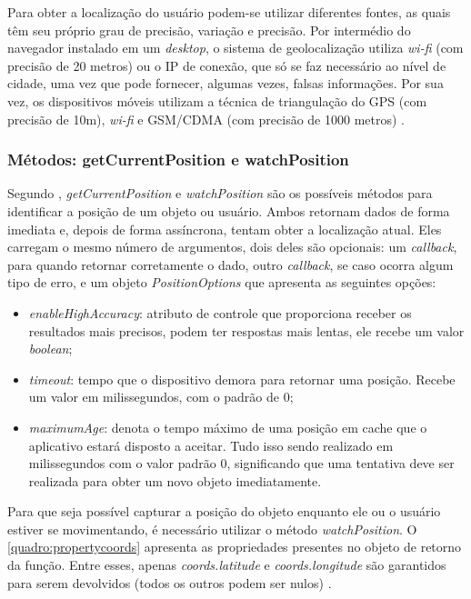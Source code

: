 Para obter a localização do usuário podem-se utilizar diferentes fontes, as quais têm seu próprio grau de precisão, variação e precisão. Por intermédio do navegador instalado em um \textit{desktop}, o sistema de geolocalização utiliza \textit{wi-fi} (com precisão de 20 metros) ou o IP de conexão, que só se faz necessário ao nível de cidade,  uma vez que pode fornecer, algumas vezes, falsas informações. Por sua vez, os dispositivos móveis utilizam a técnica de triangulação do GPS (com precisão de 10m), \textit{wi-fi} e GSM/CDMA (com precisão de 1000 metros) \cite{geolocalizacao:2011}.

\subsubsection{Métodos: getCurrentPosition e watchPosition}

Segundo , \textit{getCurrentPosition} e \textit{watchPosition} são os possíveis métodos para identificar a posição de um objeto ou usuário. Ambos retornam dados de forma imediata e, depois de forma assíncrona, tentam obter a localização atual. Eles carregam o mesmo número de argumentos, dois deles são opcionais: um \textit{callback}, para quando retornar corretamente o dado, outro \textit{callback}, se caso ocorra algum tipo de erro, e um objeto \textit{PositionOptions} que apresenta as seguintes opções:

\newpage
\begin{itemize}
    \item \textit{enableHighAccuracy}: atributo de controle que proporciona receber os resultados mais precisos, podem ter respostas mais lentas, ele recebe um valor \textit{boolean};
    \item \textit{timeout}: tempo que o dispositivo demora para retornar uma posição. Recebe um valor em milissegundos, com o padrão de 0;
    \item \textit{maximumAge}: denota o tempo máximo de uma posição em cache que o aplicativo estará disposto a aceitar. Tudo isso sendo realizado em milissegundos com o valor padrão 0, significando que uma tentativa deve ser realizada para obter um novo objeto imediatamente.
\end{itemize}

Para que seja possível capturar a posição do objeto enquanto ele ou o usuário estiver se movimentando, é necessário utilizar o método \textit{watchPosition}. O \autoref{quadro:propertycoords} apresenta as propriedades presentes no objeto de retorno da função. Entre esses, apenas \textit{coords.latitude} e \textit{coords.longitude} são garantidos para serem devolvidos (todos os outros podem ser nulos) \cite{geolocalizacao:2011}.

